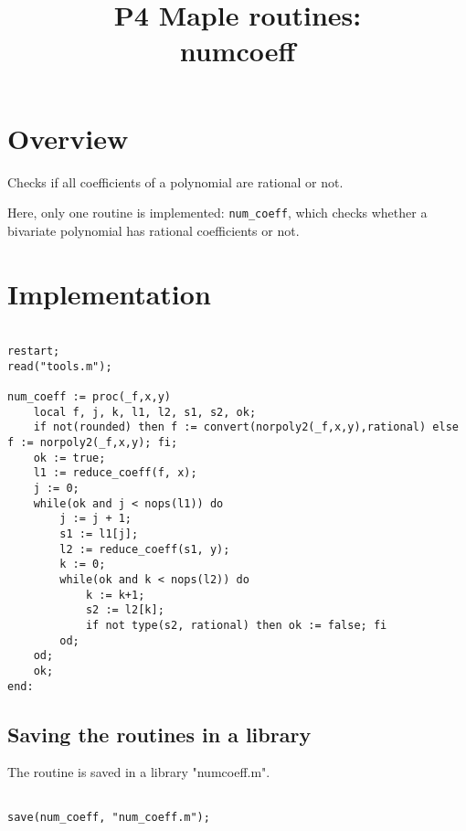 \documentclass[a4paper,10pt]{article}
\title{P4 Maple routines:\\numcoeff}
\author{}
\date{}
\begin{document}
\maketitle

\section{Overview}

Checks if all coefficients of a polynomial are rational or not.

Here, only one routine is implemented: \verb+num_coeff+, which checks whether a bivariate polynomial
has rational coefficients or not.

\section{Implementation}

\begin{lstlisting}[name=numcoeff]

restart;
read("tools.m");

num_coeff := proc(_f,x,y)
    local f, j, k, l1, l2, s1, s2, ok;
    if not(rounded) then f := convert(norpoly2(_f,x,y),rational) else f := norpoly2(_f,x,y); fi;
    ok := true;
    l1 := reduce_coeff(f, x);
    j := 0;
    while(ok and j < nops(l1)) do
        j := j + 1;
        s1 := l1[j];
        l2 := reduce_coeff(s1, y);
        k := 0;
        while(ok and k < nops(l2)) do
            k := k+1;
            s2 := l2[k];
            if not type(s2, rational) then ok := false; fi
        od;
    od;
    ok;
end:

\end{lstlisting}


\subsection{Saving the routines in a library}

The routine is saved in a library "numcoeff.m".

\begin{lstlisting}[name=gcd]

save(num_coeff, "num_coeff.m");

\end{lstlisting}
\end{document}
